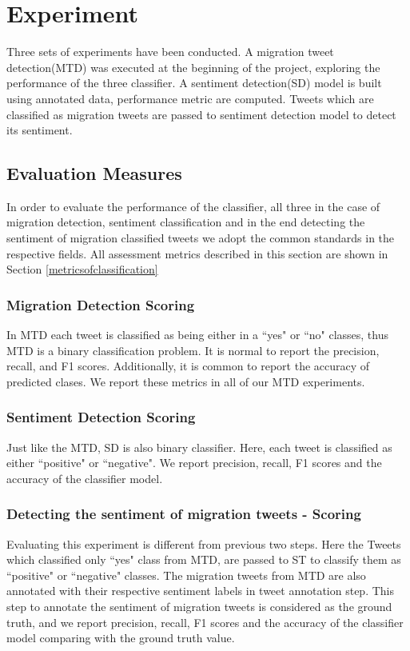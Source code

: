 \chapter{Experiment}\label{chap:experiment}

Three sets of experiments have been conducted. A migration tweet detection(MTD) was executed at the beginning of the project, exploring the performance of the three classifier. A sentiment detection(SD) model is built using annotated data, performance metric are computed. Tweets which are classified as migration tweets are passed to sentiment detection model to detect its sentiment.

\section{Evaluation Measures}

In order to evaluate the performance of the classifier, all three in the case of migration detection, sentiment classification and in the end detecting the sentiment of migration classified tweets we adopt the common standards in the respective fields. All assessment metrics described in this section are shown in Section \ref{metricsofclassification}

\subsection{Migration Detection Scoring}
In MTD each tweet is classified as being either in a ``yes" or ``no" classes, thus MTD is a binary classification problem. It is normal to report the precision, recall, and F1 scores. Additionally, it is common to report the accuracy of predicted clases. We report these metrics in all of our MTD experiments.



\subsection{Sentiment Detection Scoring}
Just like the MTD, SD is also binary classifier. Here, each tweet is classified as either ``positive" or ``negative". We report precision, recall, F1 scores and the accuracy of the classifier model.

\subsection{Detecting the sentiment of migration tweets - Scoring}
Evaluating this experiment is different from previous two steps. Here the Tweets which classified only ``yes" class from MTD, are passed to ST to classify them as ``positive" or ``negative" classes.  The migration tweets from MTD are also annotated with their respective sentiment labels in tweet annotation step. This step to annotate the sentiment of migration tweets is considered as the ground truth, and we report precision, recall, F1 scores and the accuracy of the classifier model comparing with the ground truth value.




